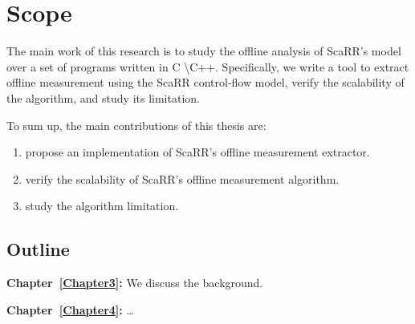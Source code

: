 
\chapter{Scope} %
\label{Chapter2} %





The main work of this research is to study the offline analysis of ScaRR's 
model~\cite{toffaliniScaRRScalableRuntime2019} over a set of programs written 
in C \textbackslash C++. 
Specifically, we write a tool to extract offline measurement using the ScaRR 
control-flow model, verify the scalability of the algorithm, and study its 
limitation.

To sum up, the main contributions of this thesis are:
\begin{enumerate}
	\item propose an implementation of ScaRR's offline measurement extractor.
	\item verify the scalability of ScaRR's offline measurement algorithm.
	\item study the algorithm limitation.
\end{enumerate}

\section{Outline}
\label{sec:outline}


\vspace{0.5cm}
\noindent \textbf{Chapter~\ref{Chapter3}:} We discuss the background.

\vspace{0.5cm}
\noindent \textbf{Chapter~\ref{Chapter4}:} \dots